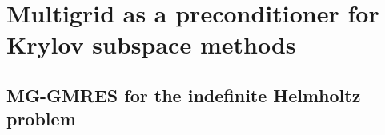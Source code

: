 \documentclass[a4paper,12pt]{article}
\begin{document}
\section{Multigrid as a preconditioner for Krylov subspace methods}

\subsection{MG-GMRES for the indefinite Helmholtz problem}
\end{document}
